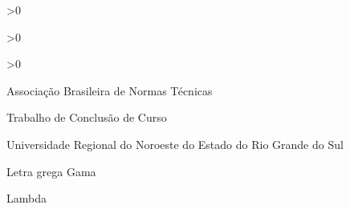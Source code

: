 \documentclass[
    12pt,               %
    oneside,            %
    a4paper,            %
    chapter=TITLE,      %
    section=TITLE,      %
    english,            %
    brazil              %
]{abntex2}
\begin{document}
\ifnum{}>0
    \listoffigures*
    \cleardoublepage
\fi

\ifnum{}>0
    \listofquadros*
    \cleardoublepage
\fi

\ifnum{}>0
    \listoftables*
    \cleardoublepage
\fi

\begin{siglas}
    \item[ABNT] Associação Brasileira de Normas Técnicas
    \item[TCC] Trabalho de Conclusão de Curso
    \item[UNIJUÍ] Universidade Regional do Noroeste do Estado do Rio Grande do Sul
\end{siglas}

\begin{simbolos}
    \item[$ \Gamma $] Letra grega Gama
    \item[$ \Lambda $] Lambda
\end{simbolos}

\tableofcontents*
\cleardoublepage

\textual








\postextual



\begin{apendicesenv}

    
\end{apendicesenv}

\begin{anexosenv}

    
\end{anexosenv}

\end{document}
